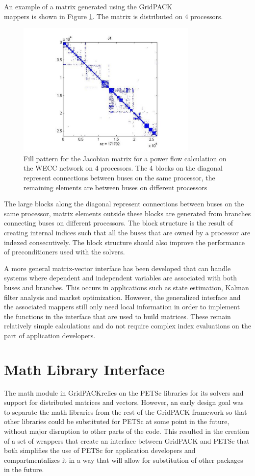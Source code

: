 \documentclass[preprint]{acm_proc_article-sp}
\begin{document}
An example of a matrix generated using the GridPACK\texttrademark\\
mappers is
shown in Figure \ref{matrix}. The matrix is distributed on 4 processors.
\begin{figure}
\centering
\includegraphics[width=3.5in,keepaspectratio=true]{./Fig4}
\caption{\label{matrix} Fill pattern for the Jacobian matrix for a power flow
calculation on the WECC network on 4 processors. The 4 blocks on the diagonal
represent connections between buses on the same processor, the remaining elements
are between buses on different processors}
\end{figure}
The large blocks along the diagonal represent connections between buses on
the same processor, matrix elements outside these blocks are generated from
branches connecting buses on different processors. The block structure is the
result of creating internal indices such that all the buses that are owned by
a processor are indexed consecutively. The block structure should also improve
the performance of preconditioners used with the solvers.

A more general matrix-vector interface has been developed that can handle systems
where
dependent and independent variables are associated with both buses and branches.
This occurs in applications such as state estimation\cite{SE}, Kalman filter
analysis and
market optimization. However, the generalized interface and the associated
mappers still only need local information in order to implement the functions in
the interface that are used to build matrices. These remain relatively simple
calculations and do not require complex index evaluations on the part of
application developers.

\section{Math Library Interface}
The math module in
GridPACK\texttrademark relies on the PETSc libraries for its solvers and support
for distributed matrices and vectors. However, an early design goal was to
separate the math libraries from the rest of the GridPACK framework so that
other libraries could be substituted for PETSc at some point in the future,
without major disruption to other parts of the code. This resulted in the
creation of a set of wrappers that create an interface between GridPACK and
PETSc that both simplifies the use of PETSc for application developers and
compartmentalizes it in a way that will allow for substitution of other packages
in the future.
\end{document}
